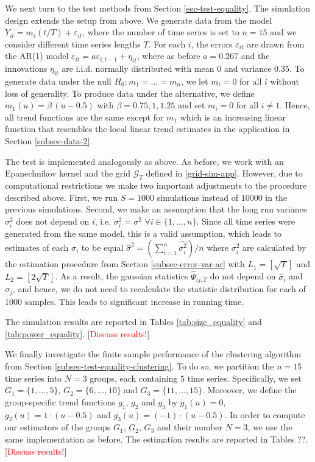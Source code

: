 We next turn to the test methods from Section \ref{sec-test-equality}. The simulation design extends the setup from above. We generate data from the model $Y_{it} = m_i(t/T) + \varepsilon_{it}$, where the number of time series is set to $n = 15$ and we consider different time series lengths $T$. For each $i$, the errors $\varepsilon_{it}$ are drawn from the AR(1) model $\varepsilon_{it} = a \varepsilon_{i,t-1} + \eta_{it}$, where as before $a = 0.267$ and the innovations $\eta_{it}$ are i.i.d. normally distributed with mean $0$ and variance $0.35$. To generate data under the null $H_0: m_1 = \ldots = m_n$, we let $m_i = 0$ for all $i$ without loss of generality. To produce data under the alternative, we define $m_1(u) = \beta \, (u - 0.5) $ with $\beta = 0.75, 1, 1.25$ and set $m_i = 0$ for all $i \ne 1$. Hence, all trend functions are the same except for $m_1$ which is an increasing linear function that resembles the local linear trend estimates in the application in Section \ref{subsec-data-2}. 


The test is implemented analogously as above. As before, we work with an Epanechnikov kernel and the grid $\mathcal{G}_T$ defined in \eqref{grid-sim-app}. However, due to computational restrictions we make two important adjustments to the procedure described above. First, we run $S = 1000$ simulations instead of $10000$ in the previous simulations. Second, we make an assumption that the long run variance $\sigma_i^2$ does not depend on $i$, i.e. $\sigma_i^2 = \sigma^2$ $\forall i\in \{1, \ldots, n\}$. Since all time series were generated from the same model, this is a valid assumption, which leads to estimates of each $\sigma_i$ to be equal $\widehat{\sigma}^2 = (\sum_{i = 1}^n\widehat{\sigma_i^2})/n$ where $\sigma_i^2$ are calculated by the estimation procedure from Section \ref{subsec-error-var-ar} with $L_1 = [\sqrt{T}]$ and $L_2 = [2 \sqrt{T}]$. As a result, the gaussian statistics $\widehat{\Psi}_{ij, T}$ do not depend on $\widehat{\sigma}_i$ and $\widehat{\sigma}_j$, and hence, we do not need to recalculate the statistic distribution for each of $1000$ samples. This leads to significant increase in running time.

The simulation results are reported in Tables \ref{tab:size_equality} and \ref{tab:power_equality}. [\textcolor{red}{Discuss results!}]


We finally investigate the finite sample performance of the clustering algorithm from Section \ref{subsec-test-equality-clustering}. To do so, we partition the $n = 15$ time series into $N=3$ groups, each containing $5$ time series. Specifically, we set $G_1 = \{1,\ldots,5\}$, $G_2 = \{6,\ldots,10\}$ and $G_3 =  \{11,\ldots,15\}$. Moreover, we define the group-specific trend functions $g_1$, $g_2$ and $g_3$ by $g_1(u) = 0$, $g_2(u) = 1 \cdot (u - 0.5)$ and $g_3(u) =  (- 1) \cdot (u - 0.5)$. In order to compute our estimators of the groups $G_1$, $G_2$, $G_3$ and their number $N = 3$, we use the same implementation as before. The estimation results are reported in Tables ??. [\textcolor{red}{Discuss results!}]   




